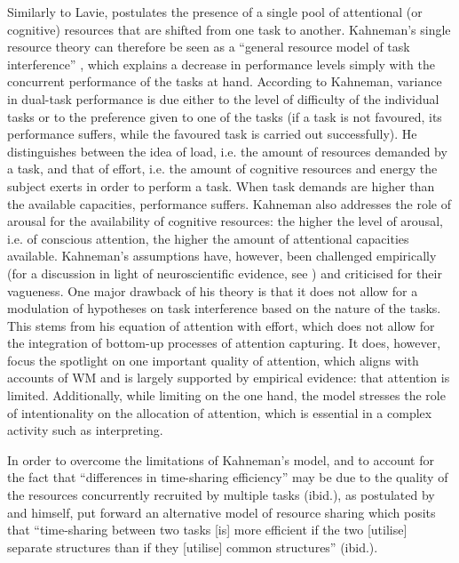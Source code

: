 Similarly to Lavie, \citet{kahneman_attention_1973} postulates the presence of a single pool of attentional (or cognitive) resources that are shifted from one task to another. Kahneman's single resource theory can therefore be seen as a ``general resource model of task interference'' \citep[162]{wickens_multiple_2002}, which explains a decrease in performance levels simply with the concurrent performance of the tasks at hand. According to Kahneman, variance in dual-task performance is due either to the level of difficulty of the individual tasks or to the preference given to one of the tasks (if a task is not favoured, its performance suffers, while the favoured task is carried out successfully). He distinguishes between the idea of load, i.e. the amount of resources demanded by a task, and that of effort, i.e. the amount of cognitive resources and energy the subject exerts in order to perform a task. When task demands are higher than the available capacities, performance suffers. Kahneman also addresses the role of arousal for the availability of cognitive resources: the higher the level of arousal, i.e. of conscious attention, the higher the amount of attentional capacities available. Kahneman's assumptions have, however, been challenged empirically (for a discussion in light of neuroscientific evidence, see \citealt{bruya_is_2018}) and criticised for their vagueness. One major drawback of his theory is that it does not allow for a modulation of hypotheses on task interference based on the nature of the tasks. This stems from his equation of attention with effort, which does not allow for the integration of bottom-up processes of attention capturing. It does, however, focus the spotlight on one important quality of attention, which aligns with accounts of WM and is largely supported by empirical evidence: that attention is limited. Additionally, while limiting on the one hand, the model stresses the role of intentionality on the allocation of attention, which is essential in a complex activity such as interpreting.

In order to overcome the limitations of Kahneman's model, and to account for the fact that ``differences in time-sharing efficiency'' may be due to the quality of the resources concurrently recruited by multiple tasks (ibid.), as postulated by \citet{kantowitz_experimenter-limited_1976} and \citet{wickens_effects_1976} himself, \citet{wickens_processing_1984,wickens_multiple_2002} put forward an alternative model of resource sharing which posits that ``time-sharing between two tasks [is] more efficient if the two [utilise] separate structures than if they [utilise] common structures'' (ibid.).

